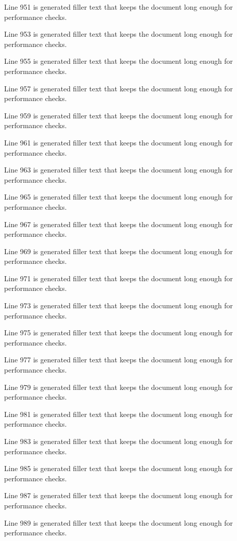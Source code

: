 Line 951 is generated filler text that keeps the document long enough for performance checks.

Line 953 is generated filler text that keeps the document long enough for performance checks.

Line 955 is generated filler text that keeps the document long enough for performance checks.

Line 957 is generated filler text that keeps the document long enough for performance checks.

Line 959 is generated filler text that keeps the document long enough for performance checks.

Line 961 is generated filler text that keeps the document long enough for performance checks.

Line 963 is generated filler text that keeps the document long enough for performance checks.

Line 965 is generated filler text that keeps the document long enough for performance checks.

Line 967 is generated filler text that keeps the document long enough for performance checks.

Line 969 is generated filler text that keeps the document long enough for performance checks.

Line 971 is generated filler text that keeps the document long enough for performance checks.

Line 973 is generated filler text that keeps the document long enough for performance checks.

Line 975 is generated filler text that keeps the document long enough for performance checks.

Line 977 is generated filler text that keeps the document long enough for performance checks.

Line 979 is generated filler text that keeps the document long enough for performance checks.

Line 981 is generated filler text that keeps the document long enough for performance checks.

Line 983 is generated filler text that keeps the document long enough for performance checks.

Line 985 is generated filler text that keeps the document long enough for performance checks.

Line 987 is generated filler text that keeps the document long enough for performance checks.

Line 989 is generated filler text that keeps the document long enough for performance checks.

